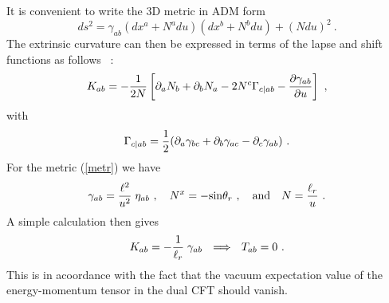 \documentclass[a4paper,12pt,oneside]{article}
\begin{document}
 It is convenient to write  the 3D metric in  ADM
form
\begin{equation}
ds^2 = \gamma_{ab}(dx^a + N^a du)(dx^b +N^b du) + (N du)^2\ .
\end{equation}
The extrinsic curvature can then be expressed in terms of the
lapse and shift functions as follows \cite{MTW}~:
\begin{equation}
K_{ab} = - {1\over 2N} \left[ \partial_{a} N_{b}
+ \partial_{b} N_{a} - 2 N^c \Gamma_{c\vert ab}
- {\partial\gamma_{ab}\over \partial u}  \right] \ ,
\label{Kadm}
\end{equation}
with
\begin{equation}
\Gamma_{c\vert ab} = {1\over 2} ( \partial_a\gamma_{bc} +
\partial_b\gamma_{ac} - \partial_c\gamma_{ab})\ .
\end{equation}
For the metric (\ref{metr}) we have
\begin{equation}
\gamma_{ab} = {\ell^2 \over u^2}\;  \eta_{ab}\ , \ \ \
N^x = - {\rm sin}\theta_{r}\ , \ \ \ {\rm and}\ \ \
N = {\ell_{r} \over u}\ .
\end{equation}
A simple calculation then gives
\begin{equation}
K_{ab} = -{1\over \ell_{r}}\; \gamma_{ab}\ \ \Longrightarrow \ \
T_{ab} = 0\ .
\end{equation}
This is in acoordance with the fact that the vacuum expectation
value of the energy-momentum tensor in the dual CFT should vanish.
\end{document}
